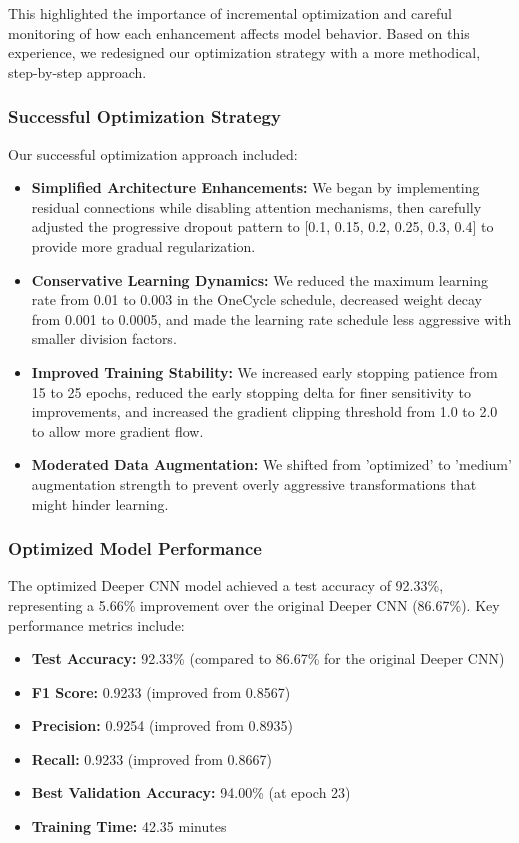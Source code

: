 This highlighted the importance of incremental optimization and careful monitoring of how each enhancement affects model behavior. Based on this experience, we redesigned our optimization strategy with a more methodical, step-by-step approach.

\subsubsection{Successful Optimization Strategy}
Our successful optimization approach included:

\begin{itemize}
    \item \textbf{Simplified Architecture Enhancements:} We began by implementing residual connections while disabling attention mechanisms, then carefully adjusted the progressive dropout pattern to [0.1, 0.15, 0.2, 0.25, 0.3, 0.4] to provide more gradual regularization.
    
    \item \textbf{Conservative Learning Dynamics:} We reduced the maximum learning rate from 0.01 to 0.003 in the OneCycle schedule, decreased weight decay from 0.001 to 0.0005, and made the learning rate schedule less aggressive with smaller division factors.
    
    \item \textbf{Improved Training Stability:} We increased early stopping patience from 15 to 25 epochs, reduced the early stopping delta for finer sensitivity to improvements, and increased the gradient clipping threshold from 1.0 to 2.0 to allow more gradient flow.
    
    \item \textbf{Moderated Data Augmentation:} We shifted from 'optimized' to 'medium' augmentation strength to prevent overly aggressive transformations that might hinder learning.
\end{itemize}

\subsubsection{Optimized Model Performance}
The optimized Deeper CNN model achieved a test accuracy of 92.33\%, representing a 5.66\% improvement over the original Deeper CNN (86.67\%). Key performance metrics include:

\begin{itemize}
    \item \textbf{Test Accuracy:} 92.33\% (compared to 86.67\% for the original Deeper CNN)
    \item \textbf{F1 Score:} 0.9233 (improved from 0.8567)
    \item \textbf{Precision:} 0.9254 (improved from 0.8935)
    \item \textbf{Recall:} 0.9233 (improved from 0.8667)
    \item \textbf{Best Validation Accuracy:} 94.00\% (at epoch 23)
    \item \textbf{Training Time:} 42.35 minutes
\end{itemize}

